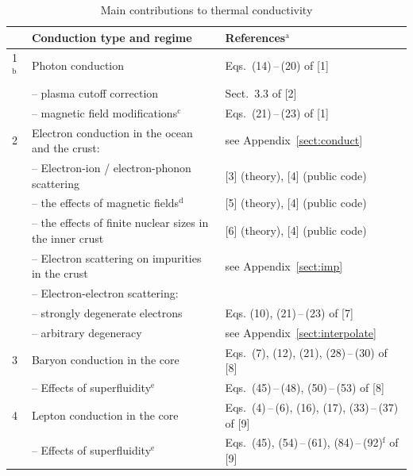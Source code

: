\documentclass[smallextended]{svjour3}       %
\begin{document}
\begin{table}[t]
\caption{Main contributions to thermal conductivity}
\setlength{\tabcolsep}{4pt}
\begin{center}
  \begin{tabular}{lll}
  \hline \hline
   & Conduction type and regime    & References$^\mathrm{a}$\rule[-1.5ex]{0pt}{4ex} \\
\hline
 1$^\mathrm{b}$ & Photon conduction
      & Eqs.~(14)\,--\,(20) of [1]\rule{0pt}{2.5ex}  \\
   & -- plasma cutoff correction &  Sect.~3.3 of [2] \\
   & -- magnetic field modifications$^\mathrm{c}$ & Eqs.~(21)\,--\,(23) of [1]  \\
 2 & Electron conduction in the ocean and the crust: &
                                see Appendix~\ref{sect:conduct}\\
   & -- Electron-ion / electron-phonon scattering & [3] (theory),
                                              [4] (public code) \\
   & \phantom{--} -- the effects of magnetic fields$^\mathrm{d}$ &
             [5] (theory), [4] (public code) \\
   & \phantom{--} -- the effects of finite nuclear sizes in the inner
                         crust & [6] (theory), [4] (public code) \\
   & -- Electron scattering on impurities in the crust &
                                     see Appendix~\ref{sect:imp} \\
   & -- Electron-electron scattering: \\
   & \phantom{--} -- strongly degenerate electrons
        & Eqs. (10), (21)\,--\,(23) of [7] \\
   & \phantom{--} -- arbitrary degeneracy
        & see Appendix~\ref{sect:interpolate} \\
 3 & Baryon conduction in the core& Eqs.~(7), (12), (21), (28)\,--\,(30) of
[8] \\
  & -- Effects of superfluidity$^\mathrm{e}$ &  Eqs.~(45)\,--\,(48),
(50)\,--\,(53) of [8] \\
 4 & Lepton conduction in the core & Eqs.~(4)\,--\,(6), (16), (17),
(33)\,--\,(37) of
[9] \\
  & -- Effects of superfluidity$^\mathrm{e}$
   & Eqs.~(45), (54)\,--\,(61), (84)\,--\,(92)$^\mathrm{f}$ of
[9] \\[1ex]
  \hline \hline
  \end{tabular}

\end{center}
\end{table}
\end{document}
